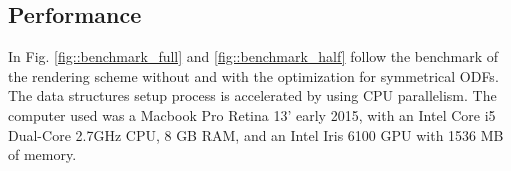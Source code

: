 \documentclass[twoside,twocolumn,10pt]{article}
\begin{document}

\subsection{Performance}

In Fig. \ref{fig::benchmark_full} and \ref{fig::benchmark_half} follow the benchmark of the rendering scheme without and with the optimization for symmetrical ODFs. The data structures setup process is accelerated by using CPU parallelism. The computer used was a Macbook Pro Retina 13' early 2015, with an Intel Core i5 Dual-Core 2.7GHz CPU, 8 GB RAM, and an Intel Iris 6100 GPU with 1536 MB of memory.
\end{document}
